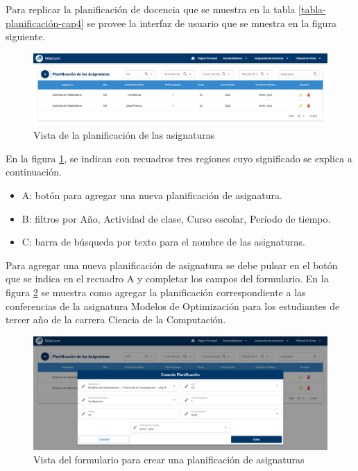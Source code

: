 Para replicar la planificación de docencia que se muestra en la tabla \ref{tabla-planificación-cap4}
se provee la interfaz de usuario que se muestra en la figura siguiente. 

\begin{figure}[H]
    \includegraphics[scale=0.3]{Graphics/Implementation/Docencia/PD-example.png}
    \caption{Vista de la planificación de las asignaturas}
    \label{img-pd-example}
\end{figure}


En la figura \ref{img-pd-example},
se indican con recuadros tres regiones cuyo significado se explica a continuación.

\begin{itemize}
    \item A: botón para agregar una nueva planificación de asignatura.
    \item B: filtros por Año, Actividad de clase, Curso escolar, Período de tiempo.
    \item C: barra de búsqueda por texto para el nombre de las asignaturas. 
\end{itemize}


Para agregar una nueva planificación de asignatura se debe pulsar en el 
botón que se indica en el recuadro A y completar los campos del formulario. 
En la figura \ref{img-pd-form} se muestra como agregar la planificación
correspondiente a las conferencias de la asignatura Modelos de Optimización
para los estudiantes de tercer año de la carrera Ciencia de la Computación. 

\begin{figure}[H]
    \includegraphics[scale=0.3]{Graphics/Implementation/Docencia/PD-form.png}
    \caption{Vista del formulario para crear una planificación de asignaturas}
    \label{img-pd-form}
\end{figure}


